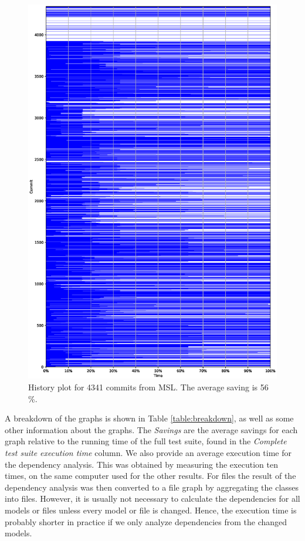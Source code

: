 \documentclass{cslthse-msc}
\begin{document}
\begin{figure}[!htbp]
    \centering
    \vspace{-0.5cm}
    \includegraphics[width=\textwidth]{Graphs/MSL_history_plot.eps}
    \caption{History plot for 4341 commits from MSL. The average saving is 56 \%.}
    \label{fig:mslhistory}
\end{figure}

\clearpage

A breakdown of the graphs is shown in Table \ref{table:breakdown}, as well as some other information about the graphs. The \textit{Savings} are the average savings for each graph relative to the running time of the full test suite, found in the \textit{Complete test suite execution time} column. We also provide an average execution time for the dependency analysis. This was obtained by measuring the execution ten times, on the same computer used for the other results. For files the result of the dependency analysis was then converted to a file graph by aggregating the classes into files. However, it is usually not necessary to calculate the dependencies for all models or files unless every model or file is changed. Hence, the execution time is probably shorter in practice if we only analyze dependencies from the changed models.
\end{document}
